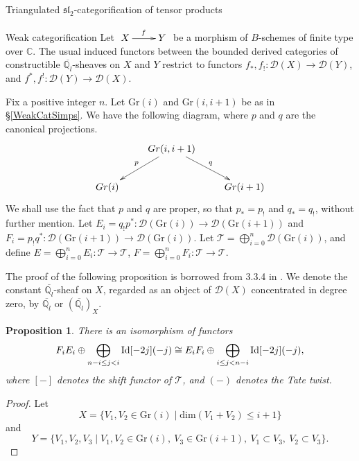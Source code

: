 \documentclass[12pt]{amsart}
\newtheorem{prpn}[thm]{Proposition}
\theoremstyle{definition}
\theoremstyle{remark}
\theoremstyle{remark}
\begin{document}
\begin{section}{Triangulated $\mathfrak{sl}_{2}$-categorification of tensor products}
\begin{subsection}{Weak categorification}
Let $\xymatrix{X \ar[r]^{f} & Y}$ be a morphism of $B$-schemes of finite type over $\mathbb{C}$. The usual induced functors between the bounded derived categories of constructible $\overline{\mathbb{Q}_{l}}$-sheaves on $X$ and $Y$ restrict to functors $f_{*},f_{!} \colon \mathcal{D}(X) \rightarrow \mathcal{D}(Y)$, and $f^{*},f^{!} \colon \mathcal{D}(Y) \rightarrow \mathcal{D}(X)$. 

Fix a positive integer $n$. Let $\text{Gr}(i)$ and $\text{Gr}(i,i+1)$ be as in \S \ref{WeakCatSimps}. We have the following diagram, where $p$ and $q$ are the canonical projections. \[ \xymatrix{ & Gr(i,i+1) \ar[dl]_{p} \ar[dr]^{q} & \\ Gr(i) & & Gr(i+1) } \] We shall use the fact that $p$ and $q$ are proper, so that $p_{*}=p_{!}$ and $q_{*} = q_{!}$, without further mention. Let $E_{i} = q_{!}p^{*} \colon \mathcal{D}(\text{Gr}(i)) \rightarrow \mathcal{D}(\text{Gr}(i+1))$ and $F_{i} = p_{!} q^{*} \colon \mathcal{D}(\text{Gr}(i+1)) \rightarrow \mathcal{D}(\text{Gr}(i))$. Let $\mathcal{T} = \bigoplus_{i=0}^{n} \mathcal{D}(\text{Gr}(i))$, and define $E = \bigoplus_{i=0}^{n} E_{i} \colon \mathcal{T} \rightarrow \mathcal{T}$, $F = \bigoplus_{i=0}^{n} F_{i} \colon \mathcal{T} \rightarrow \mathcal{T}$.       

The proof of the following proposition is borrowed from 3.3.4 in \cite{ZhengGeometricCategorificationTensorProducts}. We denote the constant $\overline{\mathbb{Q}_{l}}$-sheaf on $X$, regarded as an object of $\mathcal{D}(X)$ concentrated in degree zero, by $\overline{\mathbb{Q}_{l}}$ or $(\overline{\mathbb{Q}_{l}})_{X}$.

\begin{prpn} \label{EF-FE} There is an isomorphism of functors \[ F_{i}E_{i} \oplus \bigoplus_{n-i \leq j < i} {\rm Id}[-2j](-j) \cong E_{i} F_{i} \oplus \bigoplus_{i \leq j < n-i} {\rm Id}[-2j](-j), \] where $\left[ - \right]$ denotes the shift functor of $\mathcal{T}$, and $(-)$ denotes the Tate twist. \end{prpn}

\begin{proof} Let \[ X = \{ V_{1}, V_{2} \in \text{Gr}(i) \mid \text{dim} (V_{1} + V_{2}) \leq i+1 \} \] and \[ Y = \{ V_{1}, V_{2}, V_{3} \mid V_{1}, V_{2} \in \text{Gr}(i), \ V_{3} \in \text{Gr}(i+1), \  V_{1} \subset V_{3}, \ V_{2} \subset V_{3} \} . \] 


\end{proof}
\end{subsection}
\end{section}
\end{document}
